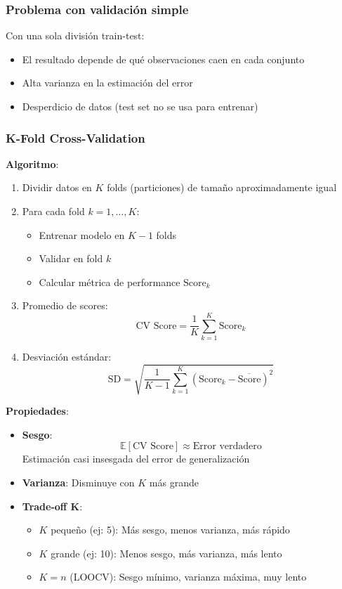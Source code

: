 \documentclass[
  doc,
  floatsintext,
  longtable,
  a4paper,
  nolmodern,
  notxfonts,
  notimes,
  12pt,
  colorlinks=true,linkcolor=blue,citecolor=blue,urlcolor=blue]{apa7}
\providecommand{\tightlist}{%
  \setlength{\itemsep}{0pt}\setlength{\parskip}{0pt}}
\begin{document}
\subsubsection{Problema con validación
simple}\label{problema-con-validaciuxf3n-simple}

Con una sola división train-test:

\begin{itemize}
\tightlist
\item
  El resultado depende de qué observaciones caen en cada conjunto
\item
  Alta varianza en la estimación del error
\item
  Desperdicio de datos (test set no se usa para entrenar)
\end{itemize}

\subsubsection{K-Fold Cross-Validation}\label{k-fold-cross-validation}

\textbf{Algoritmo}:

\begin{enumerate}
\def\labelenumi{\arabic{enumi}.}
\item
  Dividir datos en \(K\) folds (particiones) de tamaño aproximadamente
  igual
\item
  Para cada fold \(k = 1, \ldots, K\):

  \begin{itemize}
  \tightlist
  \item
    Entrenar modelo en \(K-1\) folds
  \item
    Validar en fold \(k\)
  \item
    Calcular métrica de performance \(\text{Score}_k\)
  \end{itemize}
\item
  Promedio de scores: \[
  \text{CV Score} = \frac{1}{K} \sum_{k=1}^{K} \text{Score}_k
  \]
\item
  Desviación estándar: \[
  \text{SD} = \sqrt{\frac{1}{K-1} \sum_{k=1}^{K} (\text{Score}_k - \overline{\text{Score}})^2}
  \]
\end{enumerate}

\textbf{Propiedades}:

\begin{itemize}
\item
  \textbf{Sesgo}: \[
  \mathbb{E}[\text{CV Score}] \approx \text{Error verdadero}
  \] Estimación casi insesgada del error de generalización
\item
  \textbf{Varianza}: Disminuye con \(K\) más grande
\item
  \textbf{Trade-off K}:

  \begin{itemize}
  \tightlist
  \item
    \(K\) pequeño (ej: 5): Más sesgo, menos varianza, más rápido
  \item
    \(K\) grande (ej: 10): Menos sesgo, más varianza, más lento
  \item
    \(K = n\) (LOOCV): Sesgo mínimo, varianza máxima, muy lento
  \end{itemize}
\end{itemize}
\end{document}
